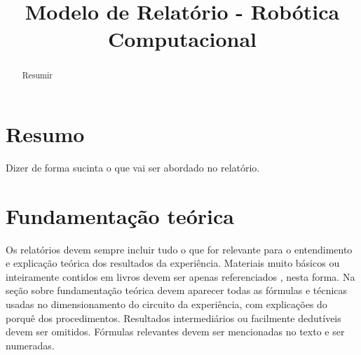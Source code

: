 \documentclass[10pt,conference]{IEEEtran}                      %
\begin{document}
\title{Modelo de Relatório - Robótica Computacional}
%
%
\author{
}
\maketitle
\begin{abstract}
Resumir
\end{abstract}
\IEEEpeerreviewmaketitle
\section{Resumo}
Dizer de forma sucinta o que vai ser abordado no relatório.
\section{Fundamentação teórica}
Os relatórios devem sempre incluir tudo o que for relevante para o entendimento e explicação teórica dos resultados da experiência. Materiais muito básicos ou inteiramente contidos em livros devem ser apenas referenciados , nesta forma. Na seção sobre fundamentação teórica devem aparecer todas as fórmulas e técnicas usadas no dimensionamento do circuito da experiência, com explicações do porquê dos procedimentos. Resultados 
intermediários ou facilmente dedutíveis devem ser omitidos. Fórmulas relevantes devem ser mencionadas no texto e ser numeradas.
\end{document}

